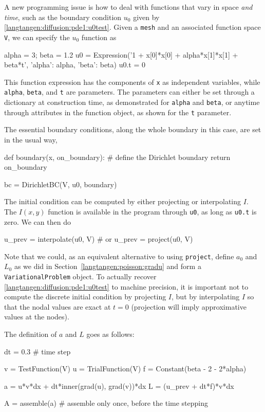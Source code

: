 A new programming issue is 
how to deal with functions that vary in space \emph{and time}, such as
the boundary condition $u_0$ given by \eqref{langtangen:diffusion:pde1:u0test}.
Given a {\fontsize{10pt}{10pt}\texttt{mesh}} and an associated function space {\fontsize{10pt}{10pt}\texttt{V}}, we 
can specify the $u_0$ function as
\begin{python}
alpha = 3; beta = 1.2
u0 = Expression('1 + x[0]*x[0] + alpha*x[1]*x[1] + beta*t',
                {'alpha': alpha, 'beta': beta})
u0.t = 0
\end{python}
This function expression has the components of {\fontsize{10pt}{10pt}\texttt{x}} as independent
variables, while {\fontsize{10pt}{10pt}\texttt{alpha}}, {\fontsize{10pt}{10pt}\texttt{beta}}, and {\fontsize{10pt}{10pt}\texttt{t}} are parameters.
The parameters can either be set through a dictionary at construction time, 
as demonstrated for {\fontsize{10pt}{10pt}\texttt{alpha}} and {\fontsize{10pt}{10pt}\texttt{beta}}, or anytime through 
attributes in the function
object, as shown for the {\fontsize{10pt}{10pt}\texttt{t}} parameter.

The essential boundary conditions, along the whole boundary in this case, 
are set in the usual way,
\begin{python}
def boundary(x, on_boundary):  # define the Dirichlet boundary
    return on_boundary

bc = DirichletBC(V, u0, boundary)
\end{python}

The initial condition can be computed by either projecting or interpolating
$I$. The $I(x,y)$ function is available in the program through
{\fontsize{10pt}{10pt}\verb!u0!}, 
as long as {\fontsize{10pt}{10pt}\verb!u0.t!} is zero.
We can then do
\begin{python}
u_prev = interpolate(u0, V)
# or
u_prev = project(u0, V)
\end{python}
Note that we could, as an equivalent alternative to using {\fontsize{10pt}{10pt}\texttt{project}}, define
$a_0$ and $L_0$ as we did in Section~\ref{langtangen:poisson:gradu} and form
a {\fontsize{10pt}{10pt}\texttt{VariationalProblem}} object.
To actually recover \eqref{langtangen:diffusion:pde1:u0test} to machine
precision, it is important not to compute the discrete initial condition by
projecting $I$, but by interpolating $I$ so that the nodal values are
exact at $t=0$ (projection will imply approximative values at the nodes).


The definition of $a$ and $L$ goes as follows:
\begin{python}
dt = 0.3      # time step

v = TestFunction(V)
u = TrialFunction(V)
f = Constant(beta - 2 - 2*alpha)

a = u*v*dx + dt*inner(grad(u), grad(v))*dx
L = (u_prev + dt*f)*v*dx

A = assemble(a)   # assemble only once, before the time stepping
\end{python}

